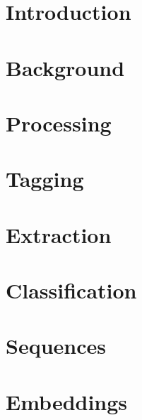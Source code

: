 \section[Intro]{Introduction}

% 

\section[Back]{Background}

\section[Proc]{Processing}

  
 


\section[Tag]{Tagging}





\section[Extr]{Extraction}
 



\section[Class]{Classification}


\section[Seq]{Sequences}



\section[Emb]{Embeddings}
% 

